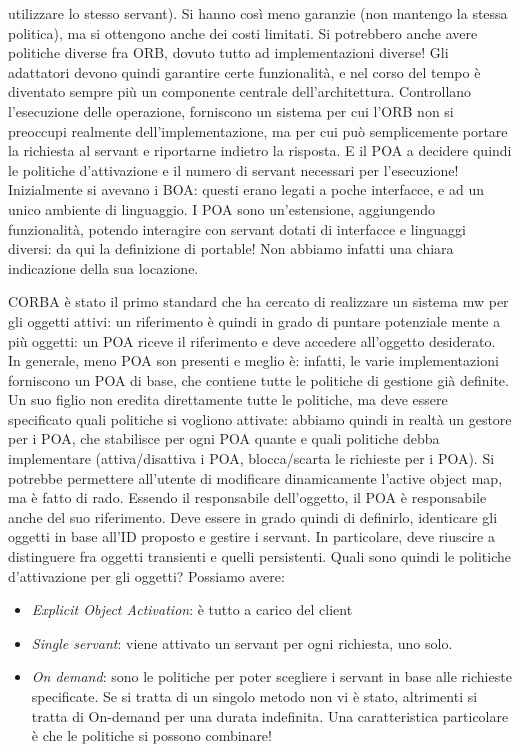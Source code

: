 utilizzare lo stesso servant). Si hanno così meno garanzie (non mantengo la stessa politica), ma si ottengono anche dei
costi limitati. Si potrebbero anche avere politiche diverse fra ORB, dovuto tutto ad implementazioni diverse!
Gli adattatori devono quindi garantire certe funzionalità, e nel corso del tempo è diventato sempre più un componente
centrale dell'architettura. Controllano l'esecuzione delle operazione, forniscono un sistema per cui l'ORB non
si preoccupi realmente dell'implementazione, ma per cui può semplicemente portare la richiesta al servant e riportarne
indietro la risposta. E il POA a decidere quindi le politiche d'attivazione e il numero di servant necessari per
l'esecuzione!
Inizialmente si avevano i BOA: questi erano legati a poche interfacce, e ad un unico ambiente di linguaggio. I POA sono
un'estensione, aggiungendo funzionalità, potendo interagire con servant dotati di interfacce e linguaggi diversi: da
qui la definizione di portable! Non abbiamo infatti una chiara indicazione della sua locazione.

CORBA è stato il primo standard che ha cercato di realizzare un sistema mw per gli oggetti attivi: un riferimento è
quindi in grado di puntare potenziale mente a più oggetti: un POA riceve il riferimento e deve accedere all'oggetto
desiderato. In generale, meno POA son presenti e meglio è: infatti, le varie implementazioni forniscono un POA di base,
che contiene tutte le politiche di gestione già definite. Un suo figlio non eredita direttamente tutte le politiche, ma
deve essere specificato quali politiche si vogliono attivate: abbiamo quindi in realtà un gestore per i POA, che
stabilisce per ogni POA quante e quali politiche debba implementare (attiva/disattiva i POA, blocca/scarta le richieste
per i POA). Si potrebbe permettere all'utente di modificare dinamicamente l'active object map, ma è fatto di rado.
Essendo il responsabile dell'oggetto, il POA è responsabile anche del suo riferimento. Deve essere in grado quindi di
definirlo, identicare gli oggetti in base all'ID proposto e gestire i servant. In particolare, deve riuscire a
distinguere fra oggetti transienti e quelli persistenti.
Quali sono quindi le politiche d'attivazione per gli oggetti? Possiamo avere:
\begin{itemize}
 \item \textit{Explicit Object Activation}: è tutto a carico del client
 \item \textit{Single servant}: viene attivato un servant per ogni richiesta, uno solo.
 \item \textit{On demand}: sono le politiche per poter scegliere i servant in base alle richieste specificate. Se si
 tratta  di un singolo metodo non vi è stato, altrimenti si tratta di On-demand per una durata indefinita. Una
 caratteristica particolare è che le politiche si possono combinare!
\end{itemize}
